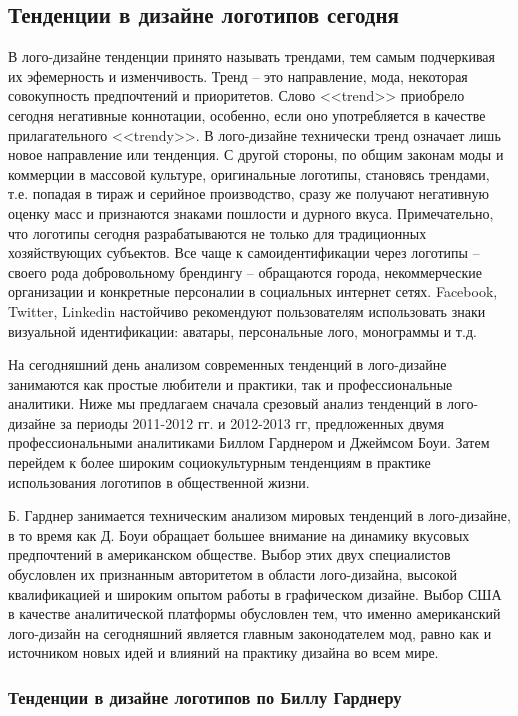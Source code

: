 \subsection{Тенденции в дизайне логотипов сегодня}
В лого-дизайне тенденции принято называть трендами, тем самым подчеркивая их эфемерность и
изменчивость. Тренд -- это направление, мода, некоторая совокупность предпочтений и
приоритетов. Слово <<trend>> приобрело сегодня негативные коннотации, особенно, если оно употребляется
в качестве прилагательного <<trendy>>. В лого-дизайне технически тренд означает лишь новое направление
или тенденция. С другой стороны, по общим законам моды и коммерции в массовой культуре, оригинальные
логотипы,  становясь трендами, т.е. попадая в тираж и серийное производство, сразу же получают
негативную оценку масс и  признаются знаками пошлости и дурного вкуса. Примечательно, что логотипы
сегодня разрабатываются не только для традиционных хозяйствующих субъектов. Все чаще к
самоидентификации через логотипы -- своего рода добровольному брендингу -- обращаются города,
некоммерческие организации и  конкретные персоналии в социальных интернет сетях. Facebook, Twitter,
Linkedin настойчиво рекомендуют пользователям использовать знаки визуальной идентификации:
аватары, персональные лого, монограммы и т.д.

На сегодняшний день анализом современных тенденций в лого-дизайне занимаются как простые любители и
практики, так и профессиональные аналитики. Ниже мы предлагаем сначала срезовый анализ тенденций в
лого-дизайне за периоды 2011-2012 гг. и 2012-2013 гг,  предложенных двумя профессиональными
аналитиками Биллом Гарднером и Джеймсом Боуи. Затем перейдем к более широким социокультурным
тенденциям в практике использования логотипов в общественной жизни.

Б. Гарднер занимается техническим анализом мировых тенденций в лого-дизайне, в то время как  Д. Боуи
обращает большее внимание на динамику вкусовых предпочтений в американском обществе. Выбор этих двух
специалистов обусловлен их признанным авторитетом в области лого-дизайна,  высокой квалификацией и
широким опытом работы в графическом дизайне.  Выбор США в качестве аналитической платформы
обусловлен  тем, что именно американский лого-дизайн на сегодняшний является главным законодателем
мод, равно как и источником новых идей и влияний на практику дизайна во всем мире.

\subsubsection{Тенденции в дизайне логотипов по Биллу Гарднеру}

